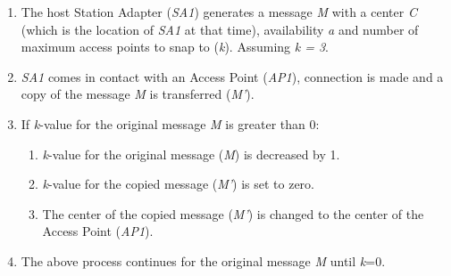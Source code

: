 	\begin{enumerate}
 	 \item The host Station Adapter (\textit{SA1}) generates a message \textit{M} with a center \textit{C} (which is the location of \textit{SA1} at that time), availability \textit{a} and number of maximum access points to snap to (\textit{k}). Assuming \textit{k = 3}.
 	 \item \textit{SA1} comes in contact with an Access Point (\textit{AP1}), connection is made and a copy of the message \textit{M} is transferred (\textit{M'}).
 	 \item If \textit{k}-value for the original message \textit{M} is greater than 0:
 	 	\begin{enumerate}
 	 		\item \textit{k}-value for the original message (\textit{M}) is decreased by 1.
 	 		\item \textit{k}-value for the copied message (\textit{M'}) is set to zero.
 	 		\item The center of the copied message (\textit{M'}) is changed to the center of the Access Point (\textit{AP1}).
 	 	\end{enumerate}
 	 \item The above process continues for the original message \textit{M} until \textit{k}=0. 	 		
 	 \end{enumerate}
 	 
